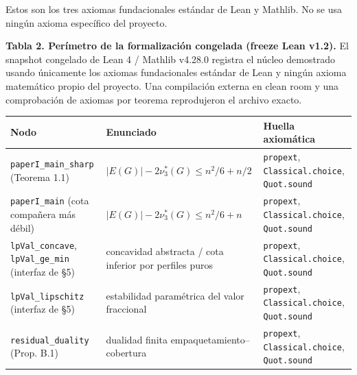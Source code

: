 \documentclass[
  spanish,
  11pt,
  a4paper,
]{article}
\newcounter{none} %
\begin{document}
Estos son los tres axiomas fundacionales estándar de Lean y Mathlib. No se usa ningún axioma específico del proyecto.

\textbf{Tabla 2. Perímetro de la formalización congelada (freeze Lean v1.2).} El snapshot congelado de Lean 4 / Mathlib v4.28.0 registra el núcleo demostrado usando únicamente los axiomas fundacionales estándar de Lean y ningún axioma matemático propio del proyecto. Una compilación externa en clean room y una comprobación de axiomas por teorema reprodujeron el archivo exacto.

{\def\LTcaptype{none} %
\begin{longtable}[]{@{}
  >{\raggedright\arraybackslash}p{}
  >{\raggedright\arraybackslash}p{}
  >{\raggedright\arraybackslash}p{}@{}}
\toprule\noalign{}
\begin{minipage}[b]{\linewidth}\raggedright
Nodo
\end{minipage} & \begin{minipage}[b]{\linewidth}\raggedright
Enunciado
\end{minipage} & \begin{minipage}[b]{\linewidth}\raggedright
Huella axiomática
\end{minipage} \\
\midrule\noalign{}
\endhead
\bottomrule\noalign{}
\endlastfoot
\texttt{paperI\_main\_sharp} (Teorema 1.1) & \(\lvert E(G)\rvert-2\nu_3^*(G)\le n^2/6+n/2\) & \texttt{propext}, \texttt{Classical.choice}, \texttt{Quot.sound} \\
\texttt{paperI\_main} (cota compañera más débil) & \(\lvert E(G)\rvert-2\nu_3^*(G)\le n^2/6+n\) & \texttt{propext}, \texttt{Classical.choice}, \texttt{Quot.sound} \\
\texttt{lpVal\_concave}, \texttt{lpVal\_ge\_min} (interfaz de §5) & concavidad abstracta / cota inferior por perfiles puros & \texttt{propext}, \texttt{Classical.choice}, \texttt{Quot.sound} \\
\texttt{lpVal\_lipschitz} (interfaz de §5) & estabilidad paramétrica del valor fraccional & \texttt{propext}, \texttt{Classical.choice}, \texttt{Quot.sound} \\
\texttt{residual\_duality} (Prop. B.1) & dualidad finita empaquetamiento--cobertura & \texttt{propext}, \texttt{Classical.choice}, \texttt{Quot.sound} \\
\end{longtable}
}
\end{document}
